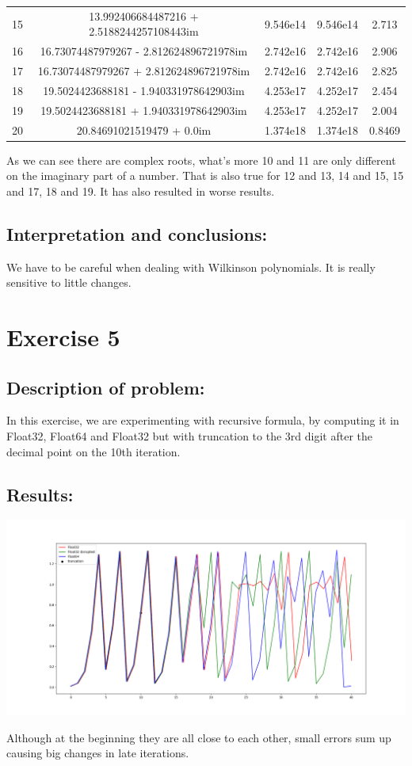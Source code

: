 \documentclass{article}
\begin{document}
\begin{center}
\begin{tabular}{| c | c | c | c | c |}
15 & 13.992406684487216 + 2.5188244257108443im & 9.546e14 & 9.546e14 & 2.713\\
16 & 16.73074487979267 - 2.812624896721978im & 2.742e16 & 2.742e16 & 2.906\\
17 & 16.73074487979267 + 2.812624896721978im & 2.742e16 & 2.742e16 & 2.825\\
18 & 19.5024423688181 - 1.940331978642903im & 4.253e17 & 4.252e17 & 2.454\\
19 & 19.5024423688181 + 1.940331978642903im & 4.253e17 & 4.252e17 & 2.004\\
20 & 20.84691021519479 + 0.0im & 1.374e18 & 1.374e18 & 0.8469\\
        \hline
    \end{tabular}
    \end{center}
As we can see there are complex roots, what's more 10 and 11 are only different on the imaginary part of a number. That is also true for 12 and 13, 14 and 15, 15 and 17, 18 and 19. It has also resulted in worse results.

\subsection*{Interpretation and conclusions:}
We have to be careful when dealing with Wilkinson polynomials. It is really sensitive to little changes.
\newpage
\section*{Exercise 5}
\subsection*{Description of problem:}
In this exercise, we are experimenting with recursive formula, by computing it in Float32, Float64 and Float32 but with truncation to the 3rd digit after the decimal point on the 10th iteration.

\subsection*{Results:}
\begin{center}
    \includegraphics[scale=0.37]{chaos}
\end{center}
 Although at the beginning they are all close to each other, small errors sum up causing big changes in late iterations.
\end{document}
